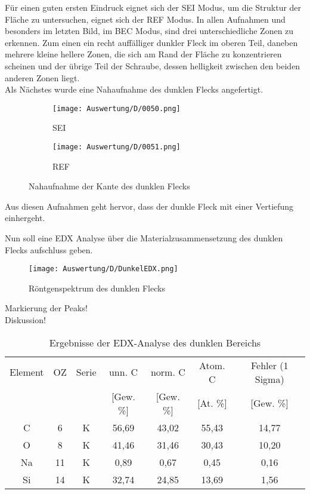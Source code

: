 Für einen guten ersten Eindruck eignet sich der SEI Modus, um die Struktur der Fläche zu untersuchen, eignet sich der REF Modus. In allen Aufnahmen und besonders im letzten Bild, im BEC Modus, sind drei unterschiedliche Zonen zu erkennen. Zum einen ein recht auffälliger dunkler Fleck im oberen Teil, daneben mehrere kleine hellere Zonen, die sich am Rand der Fläche zu konzentrieren scheinen und der übrige Teil der Schraube, dessen helligkeit zwischen den beiden anderen Zonen liegt. \\

\newpage
Als Nächstes wurde eine Nahaufnahme des dunklen Flecks angefertigt.
\begin{figure}[h]
    \centering
    
    \begin{subfigure}[b]{0.45\textwidth}
        \centering
        \texttt{[image: Auswertung/D/0050.png]}
        \caption{SEI}
    \end{subfigure}
    \hfill
    \begin{subfigure}[b]{0.45\textwidth}
        \centering
        \texttt{[image: Auswertung/D/0051.png]}
        \caption{REF}
    \end{subfigure}
    \caption{Nahaufnahme der Kante des dunklen Flecks}
\end{figure}

Aus diesen Aufnahmen geht hervor, dass der dunkle Fleck mit einer Vertiefung einhergeht.

\newpage
Nun soll eine EDX Analyse über die Materialzusammensetzung des dunklen Flecks aufschluss geben.
\begin{figure}[h]
    \centering
    \texttt{[image: Auswertung/D/DunkelEDX.png]}
    \caption{Röntgenspektrum des dunklen Flecks}
\end{figure}

Markierung der Peaks!\\
Diskussion!\\

\begin{table}[h]
    \centering
    \begin{tabular}{c|c|c|c|c|c|c}
        Element & OZ &Serie& unn. C & norm. C &  Atom. C  & Fehler (1 Sigma) \\
         & & & [Gew. \%] & [Gew. \%] & [At. \%] & [Gew. \%] \\
        \hline\hline
        C & 6 & K & 56,69 & 43,02 & 55,43 & 14,77\\
        O & 8 & K & 41,46 & 31,46 & 30,43 & 10,20\\
        Na & 11 & K & 0,89 & 0,67 & 0,45 & 0,16\\
        Si & 14 & K & 32,74 & 24,85 & 13,69 & 1,56
    \end{tabular}
    \caption{Ergebnisse der EDX-Analyse des dunklen Bereichs}
\end{table}

